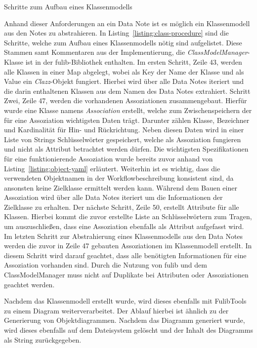 \begin{listing}[!ht]
    \inputminted[firstnumber=39]{java}{listings/3.1.4/ClassProcedure.java}
    \caption{Schritte zum Aufbau eines Klassenmodells}
    \label{listing:class-procedure}
\end{listing}

Anhand dieser Anforderungen an ein Data Note ist es möglich ein Klassenmodell aus den Notes zu abstrahieren.
In Listing~\ref{listing:class-procedure} sind die Schritte, welche zum Aufbau eines Klassenmodells nötig sind aufgelistet.
Diese Stammen samt Kommentaren aus der Implementierung, die \textit{ClassModelManager}-Klasse ist in der fulib-Bibliothek enthalten.
Im ersten Schritt, Zeile 43, werden alle Klassen in einer Map abgelegt, wobei als Key der Name der Klasse und als Value ein \textit{Clazz}-Objekt fungiert.
Hierbei wird über alle Data Notes iteriert und die darin enthaltenen Klassen aus dem Namen des Data Notes extrahiert.
Schritt Zwei, Zeile 47, werden die vorhandenen Assoziationen zusammengebaut.
Hierfür wurde eine Klasse namens \textit{Association} erstellt, welche zum Zwischenspeichern der für eine Assoziation wichtigsten Daten trägt.
Darunter zählen Klasse, Bezeichner und Kardinalität für Hin- und Rückrichtung.
Neben diesen Daten wird in einer Liste von Strings Schlüsselwörter gespeichert, welche als Assoziation fungieren und nicht als Attribut betrachtet werden dürfen.
Die wichtigsten Spezifikationen für eine funktionierende Assoziation wurde bereits zuvor anhand von Listing~\ref{listing:object-yaml} erläutert.
Weiterhin ist es wichtig, dass die verwendeten Objektnamen in der Workflowbeschreibung konsistent sind, da ansonsten keine Zielklasse ermittelt werden kann.
Während dem Bauen einer Assoziation wird über alle Data Notes iteriert um die Informationen der Zielklasse zu erhalten.
Der nächste Schritt, Zeile 50, erstellt Attribute für alle Klassen.
Hierbei kommt die zuvor erstellte Liste an Schlüsselwörtern zum Tragen, um auszuschließen, dass eine Assoziation ebenfalls als Attribut aufgefasst wird.
Im letzten Schritt zur Abstrahierung eines Klassenmodells aus den Data Notes werden die zuvor in Zeile 47 gebauten Assoziationen im Klassenmodell erstellt.
In diesem Schritt wird darauf geachtet, dass alle benötigten Informationen für eine Assoziation vorhanden sind.
Durch die Nutzung von fulib und dem ClassModelManager muss nicht auf Duplikate bei Attributen oder Assoziationen geachtet werden.

Nachdem das Klassenmodell erstellt wurde, wird dieses ebenfalls mit FulibTools zu einem Diagram weiterverarbeitet.
Der Ablauf hierbei ist ähnlich zu der Generierung von Objektdiagrammen.
Nachdem das Diagramm generiert wurde, wird dieses ebenfalls auf dem Dateisystem gelöscht und der Inhalt des Diagramms als String zurückgegeben.

